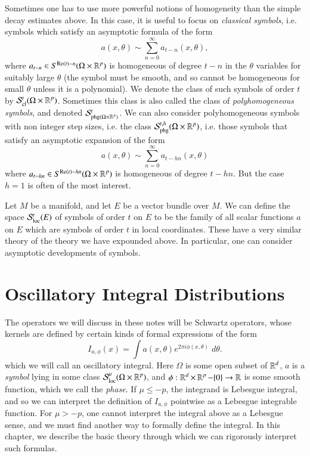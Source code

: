Sometimes one has to use more powerful notions of homogeneity than the simple decay estimates above. In this case, it is useful to focus on \emph{classical symbols}, i.e. symbols which satisfy an asymptotic formula of the form
%
\[ a(x,\theta) \sim \sum_{n = 0}^\infty a_{t-n}(x,\theta), \]
%
where $a_{t-n} \in S^{\text{Re}(t) - n}(\Omega \times \operatorname{\mathbb{R}}^p)$ is homogeneous of degree $t-n$ in the $\theta$ variables for suitably large $\theta$ (the symbol must be smooth, and so cannot be homogeneous for small $\theta$ unless it is a polynomial). We denote the class of such symbols of order $t$ by $\mathcal{S}^t_{\text{cl}}(\Omega \times \operatorname{\mathbb{R}}^p)$. Sometimes this class is also called the class of \emph{polyhomogeneous symbols}, and denoted $\mathcal{S}^t_{\text{phg}(\Omega \times \operatorname{\mathbb{R}}^p)}$. We can also consider polyhomogeneous symbols with non integer step sizes, i.e. the class $\mathcal{S}^{t,h}_{\text{phg}}(\Omega \times \operatorname{\mathbb{R}}^p)$, i.e. those symbols that satisfy an asymptotic expansion of the form
%
\[ a(x,\theta) \sim \sum_{n = 0}^\infty a_{t - hn}(x,\theta) \]
%
where $a_{t-hn} \in S^{\text{Re}(t) - hn}(\Omega \times \operatorname{\mathbb{R}}^p)$ is homogeneous of degree $t-hn$. But the case $h = 1$ is often of the most interest.

\begin{remark}
    Let $M$ be a manifold, and let $E$ be a vector bundle over $M$. We can define the space $\mathcal{S}^t_{\text{loc}}(E)$ of symbols of order $t$ on $E$ to be the family of all scalar functions $a$ on $E$ which are symbols of order $t$ in local coordinates. These have a very similar theory of the theory we have expounded above. In particular, one can consider asymptotic developments of symbols.
\end{remark}














\chapter{Oscillatory Integral Distributions}

The operators we will discuss in these notes will be Schwartz operators, whose kernels are defined by certain kinds of formal expressions of the form
%
\[ I_{a,\phi}(x) = \int a(x,\theta) e^{2 \pi i \phi(x,\theta)}\; d\theta. \]
%
which we will call an oscillatory integral. Here $\Omega$ is some open subset of $\operatorname{\mathbb{R}}^d$, $a$ is a \emph{symbol} lying in some class $\mathcal{S}^\mu_{\text{loc}}(\Omega \times \operatorname{\mathbb{R}}^p)$, and $\phi: \operatorname{\mathbb{R}}^d \times \operatorname{\mathbb{R}}^p - \{ 0 \} \to \operatorname{\mathbb{R}}$ is some smooth function, which we call the \emph{phase}. If $\mu \leq -p$, the integrand is Lebesgue integral, and so we can interpret the definition of $I_{a,\phi}$ pointwise as a Lebesgue integrable function. For $\mu > -p$, one cannot interpret the integral above as a Lebesgue sense, and we must find another way to formally define the integral. In this chapter, we describe the basic theory through which we can rigorously interpret such formulas.

